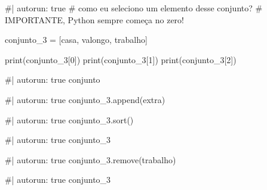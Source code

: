 \documentclass[
  letterpaper,
  DIV=11,
  numbers=noendperiod]{scrreprt}
\newenvironment{Shaded}{\begin{snugshade}}{\end{snugshade}}
\newcommand{\NormalTok}[1]{\textcolor[rgb]{0.00,0.23,0.31}{#1}}
\begin{document}
\begin{Shaded}
\begin{Highlighting}[]
\NormalTok{\#| autorun: true}
\NormalTok{\# como eu seleciono um elemento desse conjunto?}
\NormalTok{\# IMPORTANTE, Python sempre começa no zero!}

\NormalTok{conjunto\_3 = [\textquotesingle{}casa\textquotesingle{}, \textquotesingle{}valongo\textquotesingle{}, \textquotesingle{}trabalho\textquotesingle{}]}

\NormalTok{print(conjunto\_3[0])}
\NormalTok{print(conjunto\_3[1])}
\NormalTok{print(conjunto\_3[2])}
\end{Highlighting}
\end{Shaded}

\begin{Shaded}
\begin{Highlighting}[]
\NormalTok{\#| autorun: true}
\NormalTok{conjunto}
\end{Highlighting}
\end{Shaded}

\begin{Shaded}
\begin{Highlighting}[]
\NormalTok{\#| autorun: true}
\NormalTok{conjunto\_3.append(\textquotesingle{}extra\textquotesingle{})}
\end{Highlighting}
\end{Shaded}

\begin{Shaded}
\begin{Highlighting}[]
\NormalTok{\#| autorun: true}
\NormalTok{conjunto\_3.sort()}
\end{Highlighting}
\end{Shaded}

\begin{Shaded}
\begin{Highlighting}[]
\NormalTok{\#| autorun: true}
\NormalTok{conjunto\_3}
\end{Highlighting}
\end{Shaded}

\begin{Shaded}
\begin{Highlighting}[]
\NormalTok{\#| autorun: true}
\NormalTok{conjunto\_3.remove(\textquotesingle{}trabalho\textquotesingle{})}
\end{Highlighting}
\end{Shaded}

\begin{Shaded}
\begin{Highlighting}[]
\NormalTok{\#| autorun: true}
\NormalTok{conjunto\_3}
\end{Highlighting}
\end{Shaded}
\end{document}
